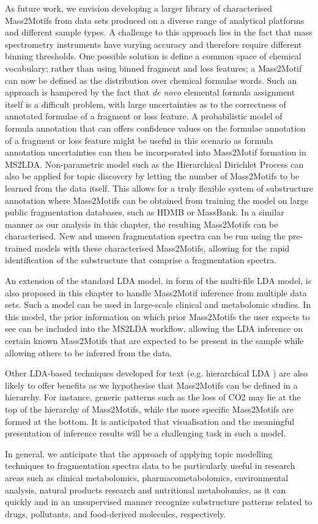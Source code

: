 As future work, we envision developing a larger library of characterised Mass2Motifs from data sets produced on a diverse range of analytical platforms and different sample types. A challenge to this approach lies in the fact that mass spectrometry instruments have varying accuracy and therefore require different binning thresholds. One possible solution is define a common space of chemical vocabulary; rather than using binned fragment and loss features; a Mass2Motif can now be defined as the distribution over chemical formulae words. Such an approach is hampered by the fact that \textit{de novo} elemental formula assignment itself is a difficult problem, with large uncertainties as to the correctness of annotated formulae of a fragment or loss feature. A probabilistic model of formula annotation that can offers confidence values on the formulae annotation of a fragment or loss feature might be useful in this scenario as formula annotation uncertainties can then be incorporated into Mass2Motif formation in MS2LDA. Non-parametric model such as the Hierarchical Dirichlet Process \cite{teh2012hierarchical} can also be applied for topic discovery by letting the number of Mass2Motifs to be learned from the data itself. This allows for a truly flexible system of substructure annotation where Mass2Motifs can be obtained from training the model on large public fragmentation databases, such as HDMB or MassBank. In a similar manner as our analysis in this chapter, the resulting Mass2Motifs can be characterised. New and unseen fragmentation spectra can be run using the pre-trained models with these characterised Mass2Motifs, allowing for the rapid identification of the substructure that comprise a fragmentation spectra.

An extension of the standard LDA model, in form of the multi-file LDA model, is also proposed in this chapter to handle Mass2Motif inference from multiple data sets. Such a model can be used in large-scale clinical and metabolomic studies. In this model, the prior information on which prior Mass2Motifs the user expects to see can be included into the MS2LDA workflow, allowing the LDA inference on certain known Mass2Motifs that are expected to be present in the sample while allowing others to be inferred from the data.

Other LDA-based techniques developed for text (e.g. hierarchical LDA \cite{griffiths2004hierarchical}) are also likely to offer benefits as we hypothesise that Mass2Motifs can be defined in a hierarchy. For instance, generic patterns such as the loss of CO2 may lie at the top of the hierarchy of Mass2Motifs, while the more specific Mass2Motifs are formed at the bottom. It is anticipated that visualisation and the meaningful presentation of inference results will be a challenging task in such a model. 

In general, we anticipate that the approach of applying topic modelling techniques to fragmentation spectra data to be particularly useful in research areas such as clinical metabolomics, pharmacometabolomics, environmental analysis, natural products research and nutritional metabolomics, as it can quickly and in an unsupervised manner recognize substructure patterns related to drugs, pollutants, and food-derived molecules, respectively. 